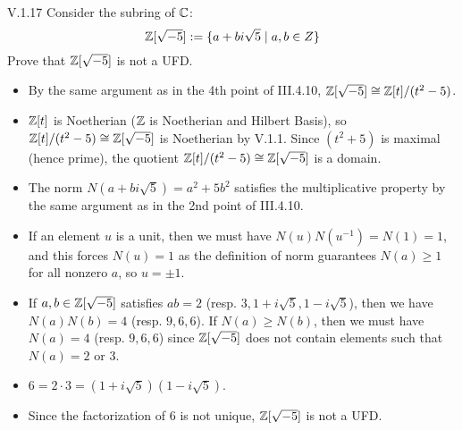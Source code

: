 \begin{problem}{V.1.17}
    Consider the subring of $\mathbb{C}$:
    \[
    \mathbb{Z}[\sqrt{-5}] := \{a+bi\sqrt{5} \; | \; a,b\in Z\}	
    \]
    Prove that $\mathbb{Z}[\sqrt{-5}]$ is not a UFD.
    \end{problem}
    \begin{pf}
\begin{itemize}
    \setlength\itemsep{0pt}
    \item By the same argument as in the 4th point of III.4.10, $\mathbb{Z}[\sqrt{-5}] \cong \mathbb{Z}[t]/(t^2-5)$.
    \item $\mathbb{Z}[t]$ is Noetherian ($\mathbb{Z}$ is Noetherian and Hilbert Basis), so $\mathbb{Z}[t]/(t^2-5) \cong \mathbb{Z}[\sqrt{-5}]$ is Noetherian by V.1.1. Since $(t^2 + 5)$ is maximal (hence prime), the quotient $\mathbb{Z}[t]/(t^2-5) \cong \mathbb{Z}[\sqrt{-5}]$ is a domain.
    \item The norm $N(a+bi\sqrt{5}) = a^2 + 5b^2$ satisfies the multiplicative property by the same argument as in the 2nd point of III.4.10.
    \item If an element $u$ is a unit, then we must have $N(u)N(u^{-1}) = N(1) = 1$, and this forces $N(u) = 1$ as the definition of norm guarantees $N(a) \geq 1$ for all nonzero $a$, so $u = \pm 1 $.
    \item If $a, b \in \mathbb{Z}[\sqrt{-5}]$ satisfies $ab = 2$ (resp. $3, 1+i\sqrt{5}, 1-i\sqrt{5}$), then we have $N(a)N(b) = 4$ (resp. $9,6,6$). If $N(a) \geq N(b)$, then we must have $N(a) = 4$ (resp. $9,6,6$) since $\mathbb{Z}[\sqrt{-5}]$ does not contain elements such that $N(a) = 2 \text{ or } 3$.
    \item $6 = 2 \cdot 3 = (1 + i \sqrt{5}) (1 - i \sqrt{5})$.
    \item Since the factorization of $6$ is not unique, $\mathbb{Z}[\sqrt{-5}]$ is not a UFD.
\end{itemize}
\end{pf}

\section{}

